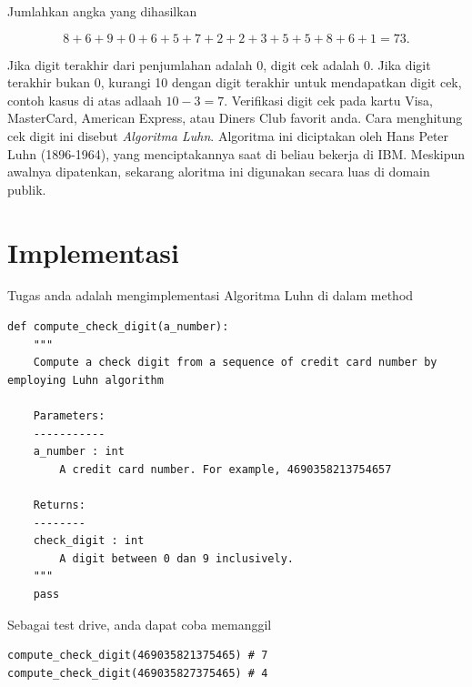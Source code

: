 \documentclass{article}
\theoremstyle{plain}
\begin{document}
\noindent Jumlahkan angka yang dihasilkan

\begin{equation*}
	8+6+9+0+6+5+7+2+2+3+5+5+8+6+1 = 73.
\end{equation*}

Jika digit terakhir dari penjumlahan adalah 0, digit cek adalah 0. Jika digit terakhir bukan 0, kurangi 10 dengan digit terakhir untuk mendapatkan digit cek, contoh kasus di atas adlaah $10 - 3 = 7$. Verifikasi digit cek pada kartu Visa, MasterCard, American Express, atau Diners Club favorit anda. Cara menghitung cek digit ini disebut \textit{Algoritma Luhn}. Algoritma ini diciptakan oleh Hans Peter Luhn (1896-1964), yang menciptakannya saat di beliau bekerja di IBM. Meskipun awalnya dipatenkan, sekarang aloritma ini  digunakan secara luas di domain publik.

\section*{Implementasi}
Tugas anda adalah mengimplementasi Algoritma Luhn di dalam method 

\begin{verbatim}
def compute_check_digit(a_number):
    """
    Compute a check digit from a sequence of credit card number by employing Luhn algorithm	
    
    Parameters:
    -----------
    a_number : int
        A credit card number. For example, 4690358213754657
    
    Returns:
    --------
    check_digit : int
        A digit between 0 dan 9 inclusively. 
    """
    pass
\end{verbatim}

\noindent Sebagai test drive, anda dapat coba memanggil
\begin{verbatim}
compute_check_digit(469035821375465) # 7
compute_check_digit(469035827375465) # 4
\end{verbatim}




\end{document}
